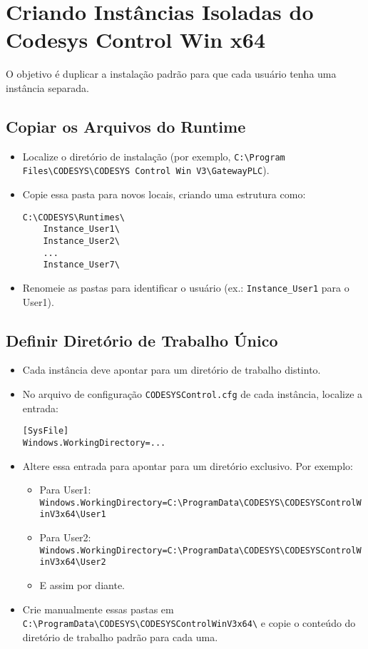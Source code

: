 \documentclass[12pt,a4paper]{article}
\begin{document}
\section{Criando Instâncias Isoladas do Codesys Control Win x64}
O objetivo é duplicar a instalação padrão para que cada usuário tenha uma instância separada.

\subsection{Copiar os Arquivos do Runtime}
\begin{itemize}[label=\textbullet]
  \item Localize o diretório de instalação (por exemplo, \texttt{C:\textbackslash{}Program Files\textbackslash{}CODESYS\textbackslash{}CODESYS Control Win V3\textbackslash{}GatewayPLC\texttt{}}).
  \item Copie essa pasta para novos locais, criando uma estrutura como:
    \begin{verbatim}
C:\CODESYS\Runtimes\
    Instance_User1\
    Instance_User2\
    ...
    Instance_User7\
    \end{verbatim}
  \item Renomeie as pastas para identificar o usuário (ex.: \texttt{Instance\_User1} para o User1).
\end{itemize}

\subsection{Definir Diretório de Trabalho Único}
\begin{itemize}[label=\textbullet]
  \item Cada instância deve apontar para um diretório de trabalho distinto.
  \item No arquivo de configuração \texttt{CODESYSControl.cfg} de cada instância, localize a entrada:
    \begin{verbatim}
[SysFile]
Windows.WorkingDirectory=...
    \end{verbatim}
  \item Altere essa entrada para apontar para um diretório exclusivo. Por exemplo:
    \begin{itemize}
      \item Para User1: \texttt{Windows.WorkingDirectory=C:\textbackslash{}ProgramData\textbackslash{}CODESYS\textbackslash{}CODESYSControlWinV3x64\textbackslash{}User1}
      \item Para User2: \texttt{Windows.WorkingDirectory=C:\textbackslash{}ProgramData\textbackslash{}CODESYS\textbackslash{}CODESYSControlWinV3x64\textbackslash{}User2}
      \item E assim por diante.
    \end{itemize}
  \item Crie manualmente essas pastas em \texttt{C:\textbackslash{}ProgramData\textbackslash{}CODESYS\textbackslash{}CODESYSControlWinV3x64\textbackslash{}} e copie o conteúdo do diretório de trabalho padrão para cada uma.
\end{itemize}
\end{document}
